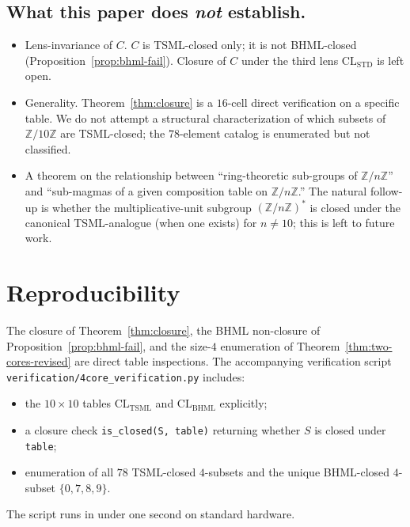 \documentclass[11pt,reqno]{amsart}
\theoremstyle{plain}
\theoremstyle{definition}
\theoremstyle{remark}
\newcommand{\Z}{\mathbb{Z}}
\newcommand{\TSML}{\mathrm{TSML}}
\newcommand{\BHML}{\mathrm{BHML}}
\begin{document}
\subsection{What this paper does \emph{not} establish.}
\begin{itemize}
\item Lens-invariance of $C$.  $C$ is TSML-closed only; it is not
BHML-closed (Proposition~\ref{prop:bhml-fail}).  Closure of $C$ under
the third lens $\mathrm{CL}_\mathrm{STD}$ is left open.
\item Generality.  Theorem~\ref{thm:closure} is a $16$-cell direct
verification on a specific table.  We do not attempt a structural
characterization of which subsets of $\Z/10\Z$ are TSML-closed; the
$78$-element catalog is enumerated but not classified.
\item A theorem on the relationship between ``ring-theoretic
sub-groups of $\Z/n\Z$'' and ``sub-magmas of a given composition
table on $\Z/n\Z$.''  The natural follow-up is whether the
multiplicative-unit subgroup $(\Z/n\Z)^*$ is closed under the
canonical TSML-analogue (when one exists) for $n \neq 10$; this is
left to future work.
\end{itemize}

\section{Reproducibility}
\label{sec:repro}

The closure of Theorem~\ref{thm:closure}, the BHML non-closure of
Proposition~\ref{prop:bhml-fail}, and the size-$4$ enumeration of
Theorem~\ref{thm:two-cores-revised} are direct table inspections.
The accompanying verification script \texttt{verification/4core\_verification.py}
includes:
\begin{itemize}
\item the $10 \times 10$ tables $\mathrm{CL}_\TSML$ and
$\mathrm{CL}_\BHML$ explicitly;
\item a closure check
\texttt{is\_closed(S, table)} returning whether $S$ is closed under
\texttt{table};
\item enumeration of all $78$ TSML-closed $4$-subsets and the unique
BHML-closed $4$-subset $\{0, 7, 8, 9\}$.
\end{itemize}
The script runs in under one second on standard hardware.

\end{document}
